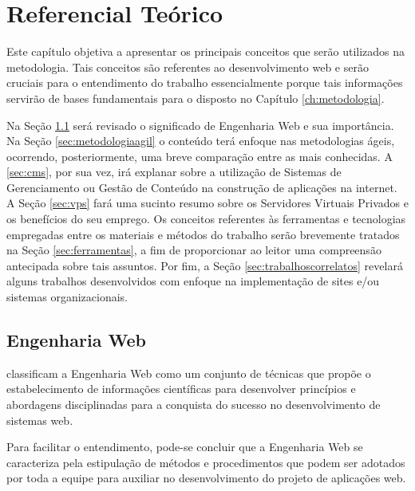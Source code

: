 \chapter{Referencial Teórico}
\label{ch:referencial}
\hspace{2.5cm}

Este capítulo objetiva a apresentar os principais conceitos que serão utilizados na metodologia. Tais conceitos são referentes ao desenvolvimento web e serão cruciais para o entendimento do trabalho essencialmente porque tais informações servirão de bases fundamentais para o disposto no Capítulo \ref{ch:metodologia}.

Na Seção \ref{sec:engenhariaweb} será revisado o significado de Engenharia Web e sua importância. Na Seção \ref{sec:metodologiaagil} o conteúdo terá enfoque nas metodologias ágeis, ocorrendo, posteriormente, uma breve comparação entre as mais conhecidas. A \ref{sec:cms}, por sua vez, irá explanar sobre a utilização de Sistemas de Gerenciamento ou Gestão de Conteúdo na construção de aplicações na internet. A Seção \ref{sec:vps} fará uma sucinto resumo sobre os Servidores Virtuais Privados e os benefícios do seu emprego. Os conceitos referentes às ferramentas e tecnologias empregadas entre os materiais e métodos do trabalho serão brevemente tratados na Seção \ref{sec:ferramentas}, a fim de proporcionar ao leitor uma compreensão antecipada sobre tais assuntos. Por fim, a Seção \ref{sec:trabalhoscorrelatos} revelará alguns trabalhos desenvolvidos com enfoque na implementação de sites e/ou sistemas organizacionais. 

\hspace{2.5cm}

\section{Engenharia Web}
\label{sec:engenhariaweb}
\hspace{2.5cm}

 classificam a Engenharia Web como um conjunto de técnicas que propõe o estabelecimento de informações científicas para desenvolver princípios e abordagens disciplinadas para a conquista do sucesso no desenvolvimento de sistemas web. 

Para facilitar o entendimento, pode-se concluir que a Engenharia Web se caracteriza pela estipulação de métodos e procedimentos que podem ser adotados por toda a equipe para auxiliar no desenvolvimento do projeto de aplicações web.

